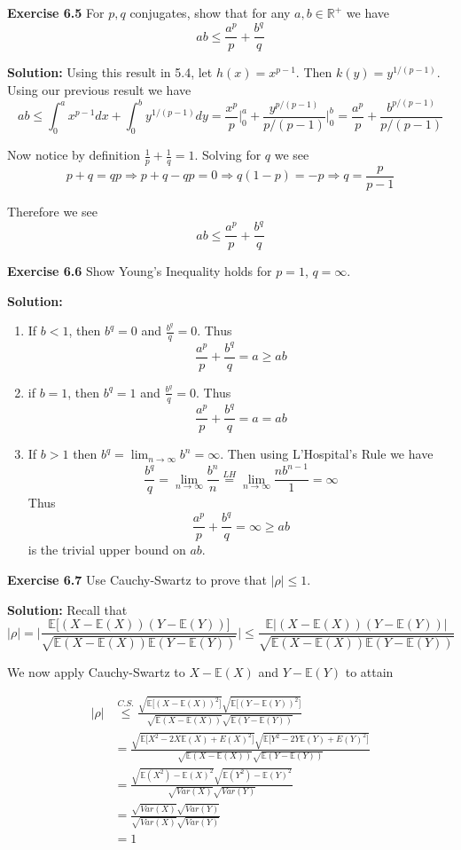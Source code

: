 \documentclass[12pt]{article}  %
\newcommand{\R}{{\mathbb{R}}}
\newcommand{\E}{{\mathbb{E}}}
\begin{document}
\newpage

\textbf{Exercise 6.5} For $p,q$ conjugates, show that for any $a,b\in\R^{+}$ we have $$ab\leq \frac{a^p}{p} + \frac{b^q}{q}$$

\textbf{Solution:} Using this result in 5.4, let $h(x) = x^{p-1}$. Then $k(y) = y^{1/(p-1)}$. Using our previous result we have $$ab\leq \int_{0}^{a}x^{p-1}dx + \int_{0}^{b}y^{1/(p-1)}dy = \frac{x^p}{p}\Big\vert_{0}^{a} + \frac{y^{p/(p-1)}}{p/(p-1)}\Big\vert_{0}^{b} = \frac{a^{p}}{p} + \frac{b^{p/(p-1)}}{p/(p-1)}$$

Now notice by definition $\frac{1}{p} + \frac{1}{q} = 1$. Solving for $q$ we see $$p + q = qp \Longrightarrow p+q-qp = 0 \Longrightarrow q(1-p) = -p\Longrightarrow q = \frac{p}{p-1}$$

Therefore we see $$ab\leq \frac{a^{p}}{p} + \frac{b^{q}}{q}$$

\newpage

\textbf{Exercise 6.6} Show Young's Inequality holds for $p = 1$, $q=\infty$. 

\textbf{Solution:} 
\begin{enumerate}
\item If $b<1$, then $b^{q} = 0$ and $\frac{b^{q}}{q} = 0$. Thus $$\frac{a^p}{p} + \frac{b^q}{q} = a\geq ab$$
\item if $b = 1$, then $b^{q} = 1$ and $\frac{b^q}{q} = 0$. Thus $$\frac{a^p}{p} + \frac{b^q}{q} = a = ab$$

\item If $b>1$ then $b^{q} = \lim_{n\to\infty}b^{n} =\infty$. Then using L'Hospital's Rule we have $$\frac{b^q}{q} = \lim _{n\to\infty}\frac{b^n}{n} \overset{LH}{=}\lim_{n\to\infty}\frac{nb^{n-1}}{1} = \infty$$
Thus $$\frac{a^p}{p} + \frac{b^q}{q} = \infty \geq ab$$ is the trivial upper bound on $ab$. 
\end{enumerate}

\newpage 

\textbf{Exercise 6.7} Use Cauchy-Swartz to prove that $|\rho|\leq1$. 

\textbf{Solution:} Recall that $$|\rho| = \bigg|\frac{\E\Big[(X - \E(X))(Y-\E(Y))\Big]}{\sqrt{\E(X - \E(X))\E(Y - \E(Y))}}\bigg|\leq \frac{\E\Big\vert(X - \E(X))(Y-\E(Y))\Big\vert}{\sqrt{\E(X - \E(X))\E(Y - \E(Y))}}$$

We now apply Cauchy-Swartz to $X-\E(X)$ and $Y-\E(Y)$ to attain

\begin{align*}
|\rho|&\overset{C.S.}{\leq}\frac{\sqrt{\E\Big[(X - \E(X))^2\Big]}\sqrt{\E\Big[(Y - \E(Y))^2\Big]}}{\sqrt{\E(X - \E(X))}\sqrt{\E(Y - \E(Y))}}\\
&= \frac{\sqrt{\E\Big[X^2 - 2X\E(X) + E(X)^2\Big]}\sqrt{\E\Big[Y^2 - 2Y\E(Y) + E(Y)^2\Big]}}{\sqrt{\E(X - \E(X))}\sqrt{\E(Y - \E(Y))}}\\
&= \frac{\sqrt{\E(X^2) - \E(X)^2}\sqrt{\E(Y^2) - \E(Y)^2}}{\sqrt{Var(X)}\sqrt{Var(Y)}}\\
&= \frac{\sqrt{Var(X)}\sqrt{Var(Y)}}{\sqrt{Var(X)}\sqrt{Var(Y)}}\\
&=1
\end{align*}
\end{document}
